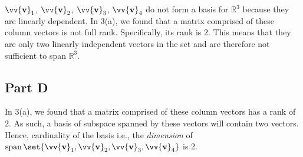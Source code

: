 \documentclass[12pt]{article}
\newcommand{\vect}[1]{\vv{\mathbf{#1}}}
\newcommand{\R}{\mathbb{R}}
\begin{document}
$\vect{v}_1$, $\vect{v}_2$, $\vect{v}_3$, $\vect{v}_4$ do not form a basis for $\R^3$ because they are linearly dependent. In 3(a), we found that a matrix comprised of these column vectors is not full rank. Specifically, its rank is $2$. This means that they are only two linearly independent vectors in the set and are therefore not sufficient to span $\R^3$.

\subsection*{Part D}

In 3(a), we found that a matrix comprised of these column vectors has a rank of 2. As such, a basis of subspace spanned by these vectors will contain two vectors. Hence, cardinality of the basis i.e., the \textit{dimension} of $\operatorname{span} \set{\vect{v}_1, \vect{v}_2, \vect{v}_3, \vect{v}_4}$ is 2.
\end{document}
